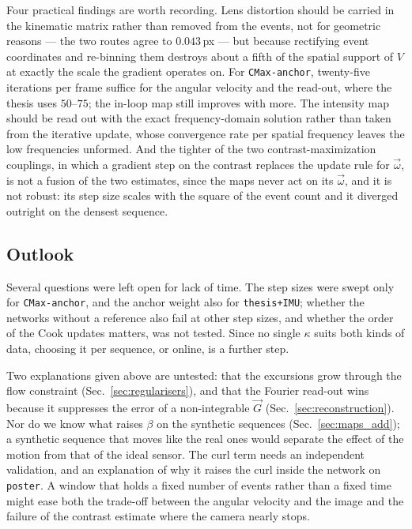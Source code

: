 \documentclass[journal]{IEEEtran}
\newcommand{\Vmap}{V}
\newcommand{\Gmap}{\vec{G}}
\newcommand{\wvec}{\vec{\omega}}
\begin{document}
Four practical findings are worth recording. Lens distortion should be carried in the kinematic matrix rather than removed from the events, not for geometric reasons --- the two routes agree to $0.043$\,px --- but because rectifying event coordinates and re-binning them destroys about a fifth of the spatial support of $\Vmap$ at exactly the scale the gradient operates on. For \texttt{CMax-anchor}, twenty-five iterations per frame suffice for the angular velocity and the read-out, where the thesis uses $50$--$75$; the in-loop map still improves with more. The intensity map should be read out with the exact frequency-domain solution rather than taken from the iterative update, whose convergence rate per spatial frequency leaves the low frequencies unformed. And the tighter of the two contrast-maximization couplings, in which a gradient step on the contrast replaces the update rule for $\wvec$, is not a fusion of the two estimates, since the maps never act on its $\wvec$, and it is not robust: its step size scales with the square of the event count and it diverged outright on the densest sequence.

\subsection*{Outlook}

Several questions were left open for lack of time. The step sizes were swept only for \texttt{CMax-anchor}, and the anchor weight also for \texttt{thesis+IMU}; whether the networks without a reference also fail at other step sizes, and whether the order of the Cook updates matters, was not tested. Since no single $\kappa$ suits both kinds of data, choosing it per sequence, or online, is a further step.

Two explanations given above are untested: that the excursions grow through the flow constraint (Sec.~\ref{sec:regularisers}), and that the Fourier read-out wins because it suppresses the error of a non-integrable $\Gmap$ (Sec.~\ref{sec:reconstruction}). Nor do we know what raises $\beta$ on the synthetic sequences (Sec.~\ref{sec:maps_add}); a synthetic sequence that moves like the real ones would separate the effect of the motion from that of the ideal sensor. The curl term needs an independent validation, and an explanation of why it raises the curl inside the network on \texttt{poster}. A window that holds a fixed number of events rather than a fixed time might ease both the trade-off between the angular velocity and the image and the failure of the contrast estimate where the camera nearly stops.
\end{document}
